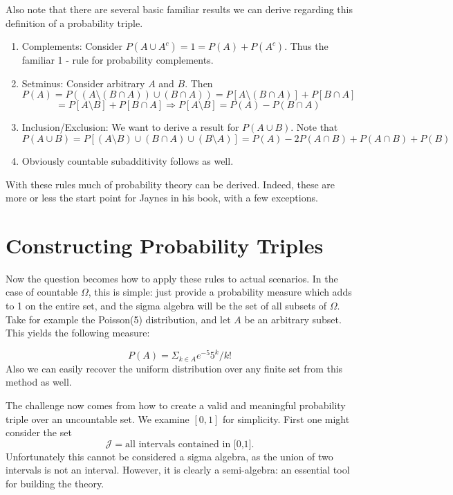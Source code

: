 \documentclass{article}
\begin{document}
Also note that there are several basic familiar results we can derive regarding this definition of a probability triple. 

\begin{enumerate}

\item Complements: Consider $P(A \cup A^c) = 1 = P(A) + P(A^c)$. Thus the familiar 1 - rule for probability complements. 

\item Setminus: Consider arbitrary $A$ and $B$. Then \[P(A) = P((A\setminus (B\cap A)) \cup (B \cap A)) = P[A\setminus (B\cap A)] + P[B \cap A] \] \[ = P[A\setminus B] + P[B \cap A] \Rightarrow  P[A\setminus B] = P(A) - P(B \cap A) \]

\item Inclusion/Exclusion: We want to derive a result for $P(A \cup B)$. Note that \[P(A \cup B) = P[ (A\setminus B) \cup (B \cap A) \cup (B \setminus A) ] = P(A) - 2P(A \cap B) + P(A \cap B) + P(B)  \]

\item Obviously countable subadditivity follows as well. 
  
\end{enumerate}

With these rules much of probability theory can be derived. Indeed, these are more or less the start point for Jaynes in his book, with a few exceptions. 


\section{Constructing Probability Triples}

Now the question becomes how to apply these rules to actual scenarios. In the case of countable $\Omega$, this is simple: just provide a probability measure which adds to 1 on the entire set, and the sigma algebra will be the set of all subsets of $\Omega$. Take for example the Poisson(5) distribution, and let $A$ be an arbitrary subset. This yields the following measure:

\[P(A) = \Sigma_{k \in A} e^{-5} 5^k / k! \] Also we can easily recover the uniform distribution over any finite set from this method as well. 

The challenge now comes from how to create a valid and meaningful probability triple over an uncountable set. We examine $[0,1]$ for simplicity. First one might consider the set \[\mathcal{J} = \text{all intervals contained in [0,1]}. \] Unfortunately this cannot be considered a sigma algebra, as the union of two intervals is not an interval. However, it is clearly a semi-algebra: an essential tool for building the theory. 
\end{document}
